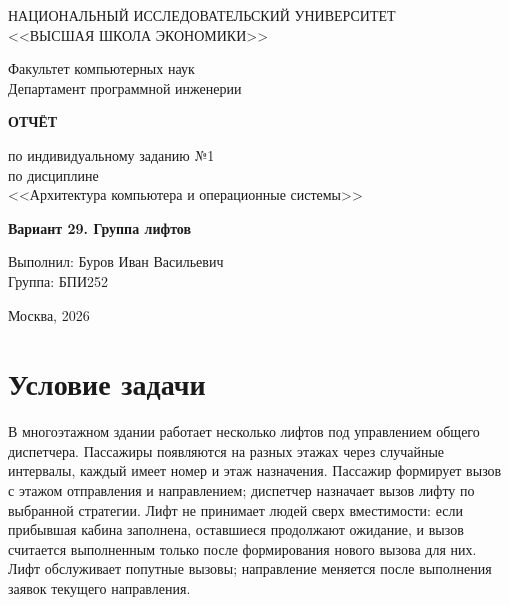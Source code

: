 \documentclass[12pt,a4paper]{article}
\begin{document}
\begin{titlepage}
\centering
\vspace*{20mm}

{\large НАЦИОНАЛЬНЫЙ ИССЛЕДОВАТЕЛЬСКИЙ УНИВЕРСИТЕТ\\
<<ВЫСШАЯ ШКОЛА ЭКОНОМИКИ>>\par}
\vspace{6mm}
{\large Факультет компьютерных наук\\
Департамент программной инженерии\par}

\vfill

{\Large\bfseries ОТЧЁТ\par}
\vspace{4mm}
{\Large по индивидуальному заданию №1\\
по дисциплине\\
<<Архитектура компьютера и операционные системы>>\par}

\vspace{12mm}
{\large\bfseries Вариант 29. Группа лифтов\par}

\vfill

\begin{flushright}
{\large Выполнил: Буров Иван Васильевич\\
Группа: БПИ252\par}
\end{flushright}

\vspace{12mm}
{\large Москва, 2026\par}
\end{titlepage}

\section{Условие задачи}

В многоэтажном здании работает несколько лифтов под управлением общего
диспетчера. Пассажиры появляются на разных этажах через случайные
интервалы, каждый имеет номер и этаж назначения. Пассажир формирует вызов
с этажом отправления и направлением; диспетчер назначает вызов лифту по
выбранной стратегии. Лифт не принимает людей сверх вместимости: если
прибывшая кабина заполнена, оставшиеся продолжают ожидание, и вызов
считается выполненным только после формирования нового вызова для них.
Лифт обслуживает попутные вызовы; направление меняется после выполнения
заявок текущего направления.
\end{document}
